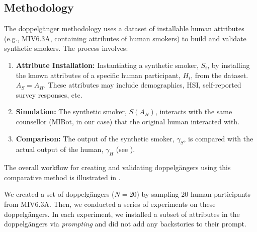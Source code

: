 \subsection{Methodology}
The doppelgänger methodology uses a dataset of installable human attributes (e.g., MIV6.3A, containing attributes of human smokers) to build and validate synthetic smokers. The process involves:

\begin{enumerate}
	\item \textbf{Attribute Installation:} Instantiating a synthetic smoker, $S_i$, by installing the known attributes of a specific human participant, $H_i$, from the dataset. $A_S = A_H$. These attributes may include demographics, HSI, self-reported survey responses, etc.
	\item \textbf{Simulation:} The synthetic smoker, $S(A_H)$, interacts with the same counsellor (MIBot, in our case) that the original human interacted with.
	\item \textbf{Comparison:} The output of the synthetic smoker, $\gamma_S$, is compared with the actual output of the human, $\gamma_H$ (see ).
\end{enumerate}



The overall workflow for creating and validating doppelgängers using this comparative method is illustrated in .



We created a set of doppelgängers ($N = 20$) by sampling 20 human participants from MIV6.3A. Then, we conducted a series of experiments on these doppelgängers. In each experiment, we installed a subset of attributes in the doppelgängers via \emph{prompting} and did not add any backstories to their prompt.



